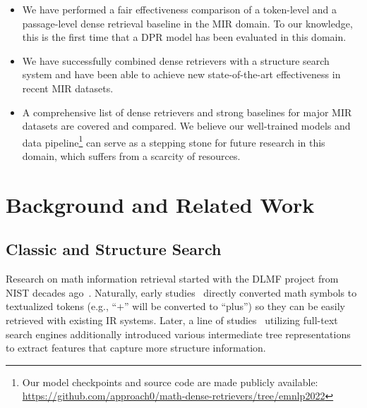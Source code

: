 \documentclass[11pt]{article}
\begin{document}
\begin{itemize}[leftmargin=*]
  \item We have performed a fair effectiveness comparison of a token-level and a passage-level dense retrieval baseline in the MIR domain. To our knowledge, this is the first time that a DPR model has been evaluated in this domain.
  
  \item We have successfully combined dense retrievers with a structure search system and have been able to achieve new state-of-the-art effectiveness in recent MIR datasets.

  \item A comprehensive list of dense retrievers and strong baselines for major MIR datasets are covered and compared. We believe our well-trained models and data pipeline\footnote{Our model checkpoints and source code are made publicly available: \url{https://github.com/approach0/math-dense-retrievers/tree/emnlp2022}} can serve as a stepping stone for future research in this domain, which suffers from a scarcity of resources.
  
\end{itemize}

\section{Background and Related Work}

\subsection{Classic and Structure Search}

Research on math information retrieval started with the DLMF project from NIST decades ago~\cite{miller2003technical}.
Naturally, early studies~\cite{miller2003technical,youssef2005issue_and_methods} directly converted math symbols to textualized tokens (e.g., ``$+$'' will be converted to ``plus'') so they can be easily retrieved with existing IR systems.
Later, a line of studies~\cite{hijikata2009search,sojka2011art,lin2014mathematics,zanibbi2015tangent,kristianto2016mcat,fraser2018tangentL} utilizing full-text search engines additionally introduced various intermediate tree representations to extract features that capture more structure information.
\end{document}
